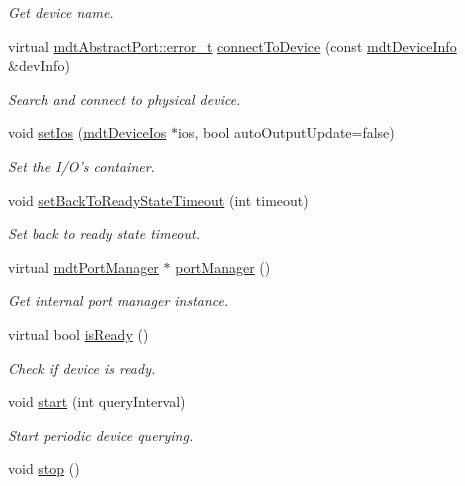 \begin{DoxyCompactItemize}
\begin{DoxyCompactList}\small\item\em Get device name. \end{DoxyCompactList}\item 
virtual \hyperlink{classmdt_abstract_port_ad4121bb930c95887e77f8bafa065a85e}{mdtAbstractPort::error\_\-t} \hyperlink{classmdt_device_abab1b6e45af527880ce469ae318474c0}{connectToDevice} (const \hyperlink{classmdt_device_info}{mdtDeviceInfo} \&devInfo)
\begin{DoxyCompactList}\small\item\em Search and connect to physical device. \end{DoxyCompactList}\item 
void \hyperlink{classmdt_device_a9f1de62ef54974b0636dee673bd819e2}{setIos} (\hyperlink{classmdt_device_ios}{mdtDeviceIos} $\ast$ios, bool autoOutputUpdate=false)
\begin{DoxyCompactList}\small\item\em Set the I/O's container. \end{DoxyCompactList}\item 
void \hyperlink{classmdt_device_aa241c40514683254990e742cf1bbb155}{setBackToReadyStateTimeout} (int timeout)
\begin{DoxyCompactList}\small\item\em Set back to ready state timeout. \end{DoxyCompactList}\item 
virtual \hyperlink{classmdt_port_manager}{mdtPortManager} $\ast$ \hyperlink{classmdt_device_a06d9178b4133fd7b23084e712af20976}{portManager} ()
\begin{DoxyCompactList}\small\item\em Get internal port manager instance. \end{DoxyCompactList}\item 
virtual bool \hyperlink{classmdt_device_a8887a1142d3d3be673c18cf3376e7af4}{isReady} ()
\begin{DoxyCompactList}\small\item\em Check if device is ready. \end{DoxyCompactList}\item 
void \hyperlink{classmdt_device_a721c5bf2cfa0eef5304333f08da182f7}{start} (int queryInterval)
\begin{DoxyCompactList}\small\item\em Start periodic device querying. \end{DoxyCompactList}\item 
\hypertarget{classmdt_device_adc7ff8f01d68506283a3d0cc6bc25407}{
void \hyperlink{classmdt_device_adc7ff8f01d68506283a3d0cc6bc25407}{stop} ()}
\label{classmdt_device_adc7ff8f01d68506283a3d0cc6bc25407}


\end{DoxyCompactItemize}

